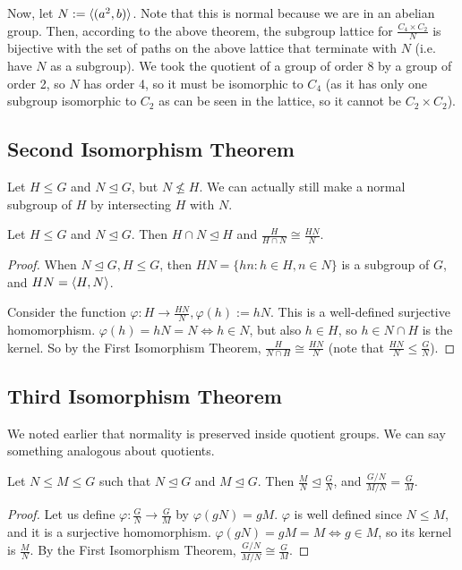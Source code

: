 Now, let $N := \langle (a^2, b) \rangle$. Note that this is normal because we are in an abelian group. Then, according to the above theorem, the subgroup lattice for $\frac{C_4 \times C_2}{N}$ is bijective with the set of paths on the above lattice that terminate with $N$ (i.e. have $N$ as a subgroup).
We took the quotient of a group of order 8 by a group of order 2, so $N$ has order 4, so it must be isomorphic to $C_4$ (as it has only one subgroup isomorphic to $C_2$ as can be seen in the lattice, so it cannot be $C_2 \times C_2$).

\subsection{Second Isomorphism Theorem}
Let $H\leq G$ and $N\trianglelefteq G$, but $N \nleq H$. We can actually still make a normal subgroup of $H$ by intersecting $H$ with $N$.
\begin{theorem}
	Let $H \leq G$ and $N \trianglelefteq G$. Then $H \cap N \trianglelefteq H$ and $\frac{H}{H \cap N} \cong \frac{HN}{N}$.
\end{theorem}
\begin{proof}
	When $N \trianglelefteq G, H \leq G$, then $HN = \{ hn: h \in H, n \in N \}$ is a subgroup of $G$, and $HN = \langle H, N \rangle$.

	Consider the function $\varphi: H \to \frac{HN}{N}, \varphi(h) := hN$. This is a well-defined surjective homomorphism. $\varphi(h) = hN = N \iff h \in N$, but also $h \in H$, so $h \in N \cap H$ is the kernel. So by the First Isomorphism Theorem, $\frac{H}{N \cap H} \cong \frac{HN}{N}$ (note that $\frac{HN}{N} \leq \frac{G}{N}$).
\end{proof}

\subsection{Third Isomorphism Theorem}
We noted earlier that normality is preserved inside quotient groups. We can say something analogous about quotients.
\begin{theorem}
	Let $N \leq M \leq G$ such that $N \trianglelefteq G$ and $M \trianglelefteq G$. Then $\frac{M}{N} \trianglelefteq \frac{G}{N}$, and $\frac{G/N}{M/N} = \frac{G}{M}$.
\end{theorem}
\begin{proof}
	Let us define $\varphi: \frac{G}{N} \to \frac{G}{M}$ by $\varphi(gN) = gM$. $\varphi$ is well defined since $N \leq M$, and it is a surjective homomorphism. $\varphi(gN) = gM = M \iff g \in M$, so its kernel is $\frac{M}{N}$. By the First Isomorphism Theorem, $\frac{G/N}{M/N} \cong \frac{G}{M}$.
\end{proof}
